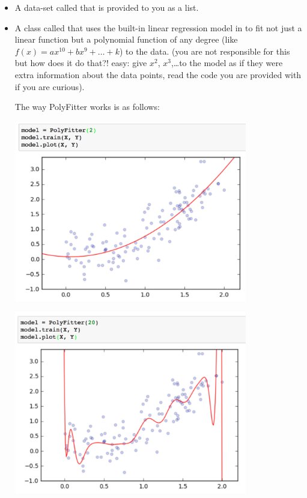 \documentclass[letterpaper,11pt]{amsart}
\theoremstyle{plain}
\theoremstyle{definition}
\begin{document}
\begin{itemize}
\item A data-set called  that is provided to you as a list.
\item A class called  that uses the built-in linear regression model in  to fit not just a linear function but a polynomial function of any degree (like $f(x) = ax^{10} + bx^9 + \dots + k$) to the data. (you are not responsible for this but how does it do that?! easy: give $x^2$, $x^3$,\dots to the model as if they were extra information about the data points, read the code you are provided with if you are curious).

The way PolyFitter works is as follows:
\begin{center}
\noindent\includegraphics[width=4.0in]{nicefit.png}
\end{center}
\begin{center}
\noindent\includegraphics[width=4.0in]{overfit.png}
\end{center}


\end{itemize}
\end{document}

